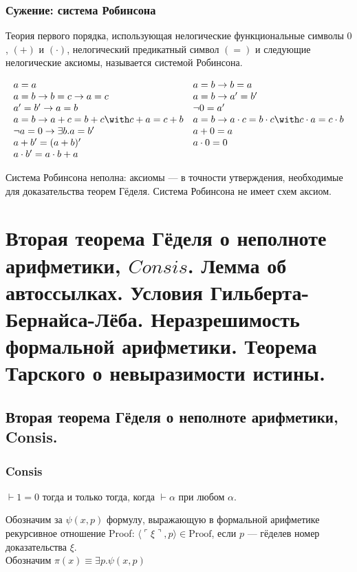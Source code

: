 \documentclass[10pt,a4paper,oneside]{article}
\begin{document}
\subsubsection{Сужение: система Робинсона}
 Теория первого порядка, использующая нелогические функциональные символы $0$, $(+)$ и $(\cdot)$, нелогический
предикатный символ $(=)$ и следующие нелогические аксиомы, называется системой Робинсона.

\vspace{-0.4cm}
$$\begin{array}{ll}
a = a & a = b \rightarrow b = a \\
a = b \rightarrow b = c \rightarrow a = c & a = b \rightarrow a' = b' \\
a' = b' \rightarrow a = b & \neg 0 = a' \\
a = b \rightarrow a + c = b + c \with c + a = c + b & a = b \rightarrow a \cdot c = b \cdot c \with c \cdot a = c \cdot b \\
\neg a = 0 \rightarrow \exists b. a = b' & a + 0 = a\\
a + b' = (a + b)' & a \cdot 0 = 0 \\
a \cdot b' = a \cdot b + a 
\end{array}$$


\vspace{-0.3cm}
Система Робинсона неполна: аксиомы --- в точности утверждения, необходимые для доказательства теорем Гёделя.
Система Робинсона не имеет схем аксиом.

\section{Вторая теорема Гёделя о неполноте арифметики, $Consis$. 
Лемма об автоссылках. Условия Гильберта-Бернайса-Лёба. Неразрешимость формальной арифметики. Теорема Тарского о невыразимости истины.}

\subsection{Вторая теорема Гёделя о неполноте арифметики, Consis.}
\subsubsection{Consis}
$\vdash 1=0$ тогда и только тогда, когда $\vdash\alpha$ при любом $\alpha$.


Обозначим за $\psi(x,p)$ формулу, выражающую в формальной арифметике рекурсивное
отношение Proof: $\langle \ulcorner\xi\urcorner,p\rangle \in \text{Proof}$, если $p$ --- гёделев номер
доказательства $\xi$. \\
Обозначим $\pi(x)\equiv\exists p.\psi(x,p)$
\end{document}
